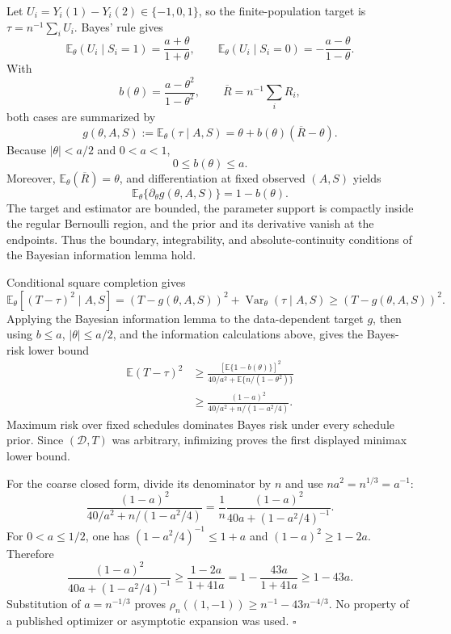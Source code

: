 Let \(U_i=Y_i(1)-Y_i(2)\in\{-1,0,1\}\), so the finite-population target is \(\tau=n^{-1}\sum_iU_i\). Bayes' rule gives
\[
 \mathbb E_\theta(U_i\mid S_i=1)=\frac{a+\theta}{1+\theta},
 \qquad
 \mathbb E_\theta(U_i\mid S_i=0)=-\frac{a-\theta}{1-\theta}.
\]
With
\[
 b(\theta)=\frac{a-\theta^2}{1-\theta^2},
 \qquad
 \overline R=n^{-1}\sum_iR_i,
\]
both cases are summarized by
\[
 g(\theta,A,S):=\mathbb E_\theta(\tau\mid A,S)
 =\theta+b(\theta)(\overline R-\theta).
\]
Because \(|\theta|<a/2\) and \(0<a<1\),
\[
 0\leq b(\theta)\leq a.
\]
Moreover, \(\mathbb E_\theta(\overline R)=\theta\), and differentiation at fixed observed \((A,S)\) yields
\[
 \mathbb E_\theta\{\partial_\theta g(\theta,A,S)\}
 =1-b(\theta).
\]
The target and estimator are bounded, the parameter support is compactly inside the regular Bernoulli region, and the prior and its derivative vanish at the endpoints. Thus the boundary, integrability, and absolute-continuity conditions of the Bayesian information lemma hold.

Conditional square completion gives
\[
 \mathbb E_\theta[(T-\tau)^2\mid A,S]
 =(T-g(\theta,A,S))^2+\operatorname{Var}_\theta(\tau\mid A,S)
 \geq(T-g(\theta,A,S))^2.
\]
Applying the Bayesian information lemma to the data-dependent target \(g\), then using \(b\leq a\), \(|\theta|\leq a/2\), and the information calculations above, gives the Bayes-risk lower bound
\[
 \begin{aligned}
 \mathbb E(T-\tau)^2
 &\geq
 \frac{\left[\mathbb E\{1-b(\theta)\}\right]^2}
 {40/a^2+\mathbb E\{n/(1-\theta^2)\}}\\
 &\geq\frac{(1-a)^2}{40/a^2+n/(1-a^2/4)}.
 \end{aligned}
\]
Maximum risk over fixed schedules dominates Bayes risk under every schedule prior. Since \((\mathcal D,T)\) was arbitrary, infimizing proves the first displayed minimax lower bound.

For the coarse closed form, divide its denominator by \(n\) and use \(na^2=n^{1/3}=a^{-1}\):
\[
 \frac{(1-a)^2}{40/a^2+n/(1-a^2/4)}
 =\frac1n\frac{(1-a)^2}{40a+(1-a^2/4)^{-1}}.
\]
For \(0<a\leq1/2\), one has \((1-a^2/4)^{-1}\leq1+a\) and \((1-a)^2\geq1-2a\). Therefore
\[
 \frac{(1-a)^2}{40a+(1-a^2/4)^{-1}}
 \geq\frac{1-2a}{1+41a}
 =1-\frac{43a}{1+41a}
 \geq1-43a.
\]
Substitution of \(a=n^{-1/3}\) proves \(\rho_n((1,-1))\geq n^{-1}-43n^{-4/3}\). No property of a published optimizer or asymptotic expansion was used. \(\square\)